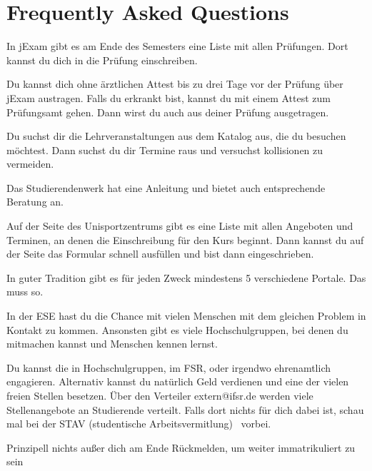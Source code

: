 \chapter*{Frequently Asked Questions}
\label{sec:faq}
In jExam  gibt es am Ende des Semesters eine Liste mit allen Prüfungen. Dort kannst du dich in die Prüfung einschreiben.

Du kannst dich ohne ärztlichen Attest bis zu drei Tage vor der Prüfung über jExam austragen. Falls du erkrankt bist, kannst du mit einem Attest zum Prüfungsamt gehen. Dann wirst du auch aus deiner Prüfung ausgetragen.

Du suchst dir die Lehrveranstaltungen aus dem Katalog aus, die du besuchen möchtest. Dann suchst du dir Termine raus und versuchst kollisionen zu vermeiden.

Das Studierendenwerk hat eine Anleitung und bietet auch entsprechende Beratung an.

Auf der Seite des Unisportzentrums gibt es eine Liste mit allen Angeboten und Terminen, an denen die Einschreibung für den Kurs beginnt. Dann kannst du auf der Seite das Formular schnell ausfüllen und bist dann eingeschrieben.

In guter Tradition gibt es für jeden Zweck mindestens 5 verschiedene Portale. Das muss so.

In der ESE hast du die Chance mit vielen Menschen mit dem gleichen Problem in Kontakt zu kommen. Ansonsten gibt es viele Hochschulgruppen, bei denen du mitmachen kannst und Menschen kennen lernst.

Du kannst die in Hochschulgruppen, im FSR, oder irgendwo ehrenamtlich engagieren. Alternativ kannst du natürlich Geld verdienen und eine der vielen freien Stellen besetzen. Über den Verteiler extern@ifsr.de werden viele Stellenangebote an Studierende verteilt. Falls dort nichts für dich dabei ist, schau mal bei der STAV (studentische Arbeitsvermitlung)~ vorbei.

Prinzipell nichts außer dich am Ende Rückmelden, um weiter immatrikuliert zu sein

